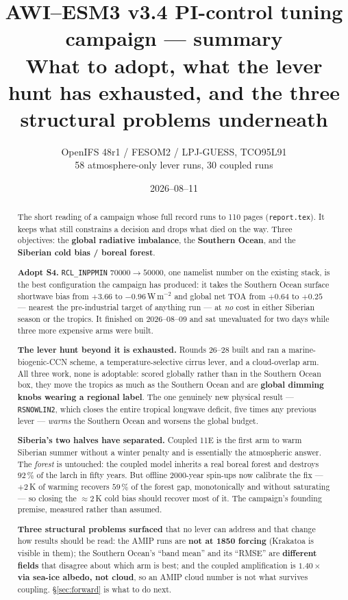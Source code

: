 \documentclass[10pt]{article}
\title{\vspace{-1.4cm}\textbf{AWI--ESM3 v3.4 PI-control tuning campaign --- summary}\\[2pt]
\large What to adopt, what the lever hunt has exhausted, and the three structural
problems underneath}
\author{OpenIFS 48r1 / FESOM2 / LPJ-GUESS, TCO95L91\\[1pt]
\normalsize 58 atmosphere-only lever runs, 30 coupled runs}
\date{2026--08--11}
\begin{document}
\maketitle
\vspace{-0.7cm}

\begin{abstract}\noindent
The short reading of a campaign whose full record runs to 110 pages
(\texttt{report.tex}). It keeps what still constrains a decision and drops what died on
the way. Three objectives: the \textbf{global radiative imbalance}, the \textbf{Southern
Ocean}, and the \textbf{Siberian cold bias / boreal forest}.

\medskip\noindent\textbf{Adopt S4.} \texttt{RCL\_INPPMIN} $70000\to50000$, one namelist
number on the existing stack, is the best configuration the campaign has produced: it
takes the Southern Ocean surface shortwave bias from $+3.66$ to $-0.96$\,W\,m$^{-2}$ and
global net TOA from $+0.64$ to $\mathbf{+0.25}$ --- nearest the pre-industrial target of
anything run --- at \emph{no} cost in either Siberian season or the tropics. It finished on
2026--08--09 and sat unevaluated for two days while three more expensive arms were built.

\medskip\noindent\textbf{The lever hunt beyond it is exhausted.} Rounds 26--28 built and
ran a marine-biogenic-CCN scheme, a temperature-selective cirrus lever, and a
cloud-overlap arm. All three work, none is adoptable: scored globally rather than in the
Southern Ocean box, they move the tropics as much as the Southern Ocean and are
\textbf{global dimming knobs wearing a regional label}. The one genuinely new physical
result --- \texttt{RSNOWLIN2}, which closes the entire tropical longwave deficit, five
times any previous lever --- \emph{warms} the Southern Ocean and worsens the global budget.

\medskip\noindent\textbf{Siberia's two halves have separated.} Coupled 11E is the first
arm to warm Siberian summer without a winter penalty and is essentially the atmospheric
answer. The \emph{forest} is untouched: the coupled model inherits a real boreal forest
and destroys $92\,\%$ of the larch in fifty years. But offline 2000-year spin-ups now
calibrate the fix --- $+2$\,K of warming recovers $59\,\%$ of the forest gap, monotonically
and without saturating --- so closing the ${\approx}2$\,K cold bias should recover most of
it. The campaign's founding premise, measured rather than assumed.

\medskip\noindent\textbf{Three structural problems surfaced} that no lever can address and
that change how results should be read: the AMIP runs are \textbf{not at 1850 forcing}
(Krakatoa is visible in them); the Southern Ocean's ``band mean'' and its ``RMSE'' are
\textbf{different fields} that disagree about which arm is best; and the coupled
amplification is \textbf{$1.40\times$ via sea-ice albedo, not cloud}, so an AMIP cloud
number is not what survives coupling. \S\ref{sec:forward} is what to do next.
\end{abstract}
\end{document}
